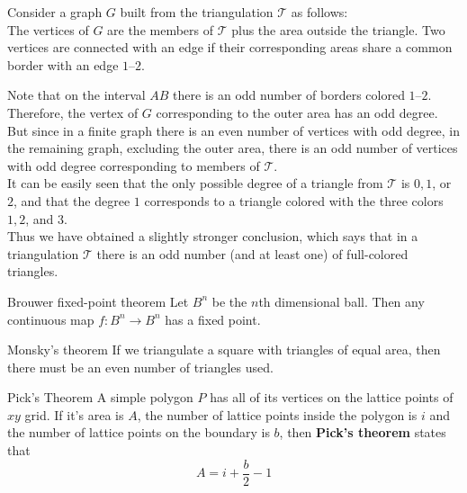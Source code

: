 \begin{prooof}
    Consider a graph $G$ built from the triangulation $\mathcal{T}$ as
    follows:\\

    {\color{solC}The vertices of $G$ are the members of $\mathcal{T}$ plus the
    area outside the triangle.  Two vertices are connected with an edge if
    their corresponding areas share a common border with an edge $1$--$2$.\\}

    Note that on the interval $AB$ there is an odd number of borders colored
    $1$--$2$. Therefore, the vertex of $G$ corresponding to the outer area has
    an odd degree. \\

    But since in a finite graph there is an even number of
    vertices with odd degree, in the remaining graph, excluding the
    outer area, there is {\color{solC}an odd number of vertices with odd
    degree} corresponding to members of $\mathcal{T}$.\\

    It can be easily seen that the only possible degree of a triangle from
    $\mathcal{T}$ is $0, 1$, or $2$, and that the degree $1$ corresponds to a
    triangle colored with the three colors $1, 2$, and $3$.\\

    Thus we have obtained a slightly stronger conclusion, which says that in a
    triangulation $\mathcal{T}$ there is an odd number (and at least one) of
    full-colored triangles. 
\end{prooof}


{Brouwer fixed-point theorem}{
    Let $B^n$ be the $n$th dimensional ball. Then any continuous map
    $f:B^n \to B^n$ has a fixed point.
}

{Monsky's theorem}{
    If we triangulate a square with triangles of equal area, then there must
    be an even number of triangles used.
}


{Pick's Theorem}{
    A simple polygon $P$ has all of its vertices on the lattice points of $xy$
    grid. If it's area is $A$, the number of lattice points inside the
    polygon is $i$ and the number of lattice points on the boundary is $b$,
    then \textbf{Pick's theorem} states that
    \[A = i + \frac{b}{2} -1\] 
}




